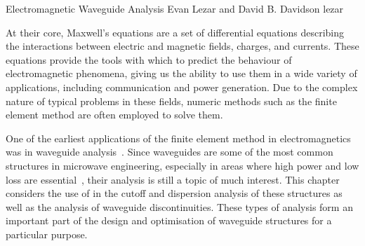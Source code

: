               {Electromagnetic Waveguide Analysis}
              {Evan Lezar and David B. Davidson}
              {lezar}

\newcommand{\curl}[2]{\nabla_{#2} \times {#1}}
\newcommand{\field}[1]{\ensuremath{\mathbf{#1}}}
\newcommand{\Ef}[0]{\field{E}}
%
\newcommand{\ko}[2]{k_{#1}^{#2}}
\newcommand{\ur}{\mu_r}
\newcommand{\er}{\epsilon_r}
\newcommand{\unit}[1]{\hat{\field{#1}}}
\newcommand{\Domain}[1]{\Omega_{#1}}
\newcommand{\Boundary}[1]{\Gamma_{#1}}
\newcommand{\intoverdomain}[2]{\int_{#2}{#1}{d#2}}
%
\newcommand{\inv}[1]{\frac{1}{#1}}
\newcommand{\del}[2]{\nabla_{#2}{#1}}
%
\newcommand{\twobytwo}[4]{\begin{bmatrix} #1 & #2\\#3 & #4\end{bmatrix}}
\newcommand{\twobyone}[2]{\begin{Bmatrix}#1\\#2\end{Bmatrix}}   


At their core, Maxwell's equations are a
set of differential equations describing the interactions between
electric and magnetic fields, charges, and currents. These equations
provide the tools with which to predict the behaviour of
electromagnetic phenomena, giving us the
ability to use them in a wide variety of applications, including
communication and power generation. Due to the complex nature of
typical problems in these fields, numeric methods such as the finite
element method are often employed to solve them.

One of the earliest applications of the finite element method in
electromagnetics was in waveguide
analysis~\cite{Dav2005}. Since waveguides are some of the most common
structures in microwave engineering, especially in areas where high
power and low loss are essential~\cite{Poz2005}, their analysis is
still a topic of much interest. This chapter considers the use of
\fenics{} in the cutoff and dispersion analysis of these structures as
well as the analysis of waveguide discontinuities. These types of
analysis form an important part of the design and optimisation of
waveguide structures for a particular purpose.

